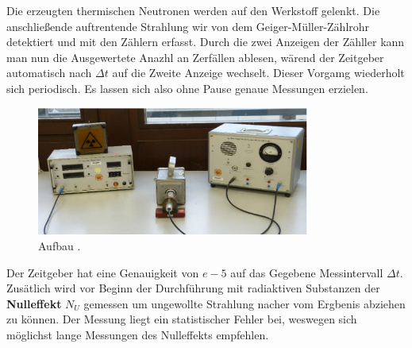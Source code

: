 Die erzeugten thermischen Neutronen %
werden auf den Werkstoff gelenkt. Die anschließende auftrentende Strahlung wir von  dem Geiger-Müller-Zählrohr detektiert und mit den Zählern erfasst.
Durch die zwei Anzeigen der Zähller kann man nun die Ausgewertete Anazhl an Zerfällen ablesen, wärend der Zeitgeber automatisch nach $\Delta t$ auf die Zweite Anzeige wechselt.
Dieser Vorgamg wiederholt sich periodisch. Es lassen sich also ohne Pause genaue Messungen erzielen.

\begin{figure}
  \centering
  \includegraphics[width=0.8\textwidth]{bilder/Screenshot 2021-01-22 103203.png}
  \caption{Aufbau  \cite{hinweis}.}
  \label{fig:aufbau}
\end{figure}

Der Zeitgeber hat eine Genauigkeit von $\si{e-5}$ auf das Gegebene Messintervall $\Delta t$.
Zusätlich wird vor Beginn der Durchführung mit radiaktiven Substanzen der \textbf{Nulleffekt} $N_U$ %
gemessen um ungewollte Strahlung nacher vom Ergbenis abziehen zu können.  Der Messung liegt ein statistischer Fehler bei, weswegen sich möglichst lange Messungen des Nulleffekts empfehlen.


